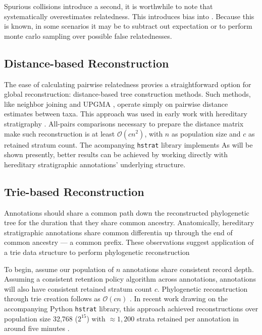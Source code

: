 Spurious collisions introduce a second, it is worthwhile to note that systematically overestimates relatedness.
This introduces bias into .
Because this is known, in some scenarios it may be to subtract out expectation or to perform monte carlo sampling over possible false relatednesses.

\subsection{Distance-based Reconstruction}

The ease of calculating pairwise relatedness provies a straightforward option for global reconstruction: distance-based tree construction methods.
Such methods, like neighbor joining and UPGMA \citep{peng2007distance}, operate simply on pairwise distance estimates between taxa.
This approach was used in early work with hereditary stratigraphy \citep{moreno2022hereditary}.
All-pairs comparisons necessary to prepare the distance matrix make such reconstruction is at least $\mathcal{O}(c n^2)$, with $n$ as population size and $c$ as retained stratum count.
The acompanying \texttt{hstrat} library implements
As will be shown presently, better results can be achieved by working directly with hereditary stratigraphic annotations' underlying structure.

\subsection{Trie-based Reconstruction}

Annotations should share a common path down the reconstructed phylogenetic tree for the duration that they share common ancestry.
Anatomically, hereditary stratigraphic annotations share common differentia up through the end of common ancestry --- a common prefix.
These observations suggest application of a trie data structure to perform phylogenetic reconstruction \citep{fredkin1960trie}

To begin, assume our population of $n$ annotations share consistent record depth.
Assuming a consistent retention policy algorithm across annotations, annotations will also have consistent retained stratum count $c$.
Phylogenetic reconstruction through trie creation follows as $\mathcal{O}(c n)$ \citep{mehta2018handbook}.
In recent work drawing on the accompanying Python \texttt{hstrat} library, this approach achieved reconstructions over population size 32,768 ($2^15$) with $\approx 1,200$ strata retained per annotation in around five minutes \citep{moreno2023toward}.

